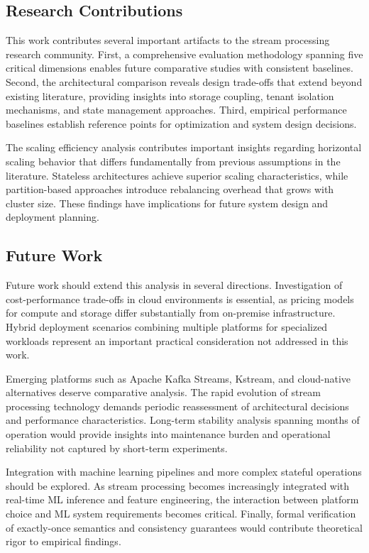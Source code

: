 \documentclass[10pt,twocolumn]{article}
\begin{document}
\subsection{Research Contributions}

This work contributes several important artifacts to the stream processing research community. First, a comprehensive evaluation methodology spanning five critical dimensions enables future comparative studies with consistent baselines. Second, the architectural comparison reveals design trade-offs that extend beyond existing literature, providing insights into storage coupling, tenant isolation mechanisms, and state management approaches. Third, empirical performance baselines establish reference points for optimization and system design decisions.

The scaling efficiency analysis contributes important insights regarding horizontal scaling behavior that differs fundamentally from previous assumptions in the literature. Stateless architectures achieve superior scaling characteristics, while partition-based approaches introduce rebalancing overhead that grows with cluster size. These findings have implications for future system design and deployment planning.

\subsection{Future Work}

Future work should extend this analysis in several directions. Investigation of cost-performance trade-offs in cloud environments is essential, as pricing models for compute and storage differ substantially from on-premise infrastructure. Hybrid deployment scenarios combining multiple platforms for specialized workloads represent an important practical consideration not addressed in this work.

Emerging platforms such as Apache Kafka Streams, Kstream, and cloud-native alternatives deserve comparative analysis. The rapid evolution of stream processing technology demands periodic reassessment of architectural decisions and performance characteristics. Long-term stability analysis spanning months of operation would provide insights into maintenance burden and operational reliability not captured by short-term experiments.

Integration with machine learning pipelines and more complex stateful operations should be explored. As stream processing becomes increasingly integrated with real-time ML inference and feature engineering, the interaction between platform choice and ML system requirements becomes critical. Finally, formal verification of exactly-once semantics and consistency guarantees would contribute theoretical rigor to empirical findings.
\end{document}
